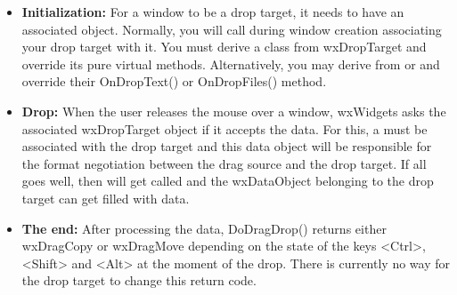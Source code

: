 \begin{itemize}\itemsep=0pt
\item {\bf Initialization:} For a window to be a drop target, it needs to have
an associated  object. Normally, you will
call  during window
creation associating your drop target with it. You must derive a class from
wxDropTarget and override its pure virtual methods. Alternatively, you may
derive from  or
 and override their OnDropText()
or OnDropFiles() method.
\item {\bf Drop:} When the user releases the mouse over a window, wxWidgets
asks the associated wxDropTarget object if it accepts the data. For this,
a  must be associated with the drop target
and this data object will be responsible for the format negotiation between
the drag source and the drop target. If all goes well, then  
will get called and the wxDataObject belonging to the drop target can get 
filled with data.
\item {\bf The end:} After processing the data, DoDragDrop() returns either
wxDragCopy or wxDragMove depending on the state of the keys <Ctrl>, <Shift>
and <Alt> at the moment of the drop. There is currently no way for the drop
target to change this return code.
\end{itemize}


